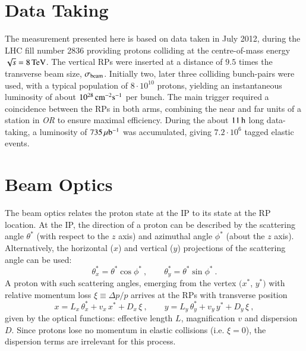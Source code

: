 \section{Data Taking}
\label{sec:data taking}

The measurement presented here is based on data taken in July 2012, during the LHC fill number 2836 providing protons colliding at the centre-of-mass energy $\sqrt s = 8\,{\rm TeV}$. The vertical RPs were inserted at a distance of $9.5$ times the transverse beam size, $\sigma_{\rm beam}$. Initially two, later three colliding bunch-pairs were used, with a typical population of $8\cdot10^{10}$ protons, yielding an instantaneous luminosity of about $10^{28}\,{\rm cm^{-2}s^{-1}}$ per bunch. The main trigger required a coincidence between the RPs in both arms, combining the near and far units of a station in \textit{OR} to ensure maximal efficiency. During the about $11\,{\rm h}$ long data-taking, a luminosity of $735\,{\rm \mu b^{-1}}$ was accumulated, giving $7.2\cdot 10^6$ tagged elastic events.



\section{Beam Optics}
\label{sec:beam optics}

The beam optics relates the proton state at the IP to its state at the RP location. At the IP, the direction of a proton can be described by the scattering angle $\theta^*$ (with respect to the $z$ axis) and azimuthal angle $\phi^*$ (about the $z$ axis). Alternatively, the horizontal ($x$) and vertical ($y$) projections of the scattering angle can be used:
\begin{equation}
\label{eq:scatt angle}
\theta_x^* = \theta^* \cos\phi^*\ ,\qquad \theta_y^* = \theta^* \sin\phi^*\ .
\end{equation}
A proton with such scattering angles, emerging from the vertex $(x^*$, $y^*)$ with relative momentum loss $\xi \equiv \Delta p / p$ arrives at the RPs with transverse position
\begin{equation}
\label{eq:prot trans}
	x = L_x\, \theta_x^* + v_x\, x^* + D_x\, \xi\ ,\qquad y = L_y\, \theta_y^* + v_y\, y^* + D_y\, \xi\ ,
\end{equation}
given by the optical functions: effective length $L$, magnification $v$ and dispersion $D$. Since protons lose no momentum in elastic collisions 
(i.e. $\xi = 0$), the dispersion terms are irrelevant for this process.

